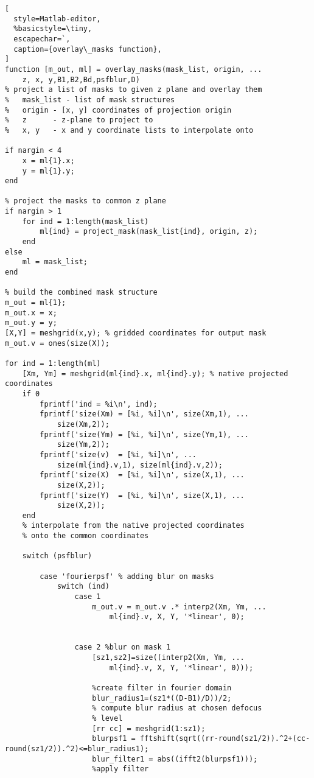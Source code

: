 \begin{lstlisting}[
  style=Matlab-editor,
  %basicstyle=\tiny,
  escapechar=`,
  caption={overlay\_masks function},
]
function [m_out, ml] = overlay_masks(mask_list, origin, ...
    z, x, y,B1,B2,Bd,psfblur,D)
% project a list of masks to given z plane and overlay them
%   mask_list - list of mask structures
%   origin - [x, y] coordinates of projection origin
%   z      - z-plane to project to
%   x, y   - x and y coordinate lists to interpolate onto

if nargin < 4
    x = ml{1}.x;
    y = ml{1}.y;
end

% project the masks to common z plane
if nargin > 1
    for ind = 1:length(mask_list)
        ml{ind} = project_mask(mask_list{ind}, origin, z);
    end
else
    ml = mask_list;
end

% build the combined mask structure
m_out = ml{1};
m_out.x = x;
m_out.y = y;
[X,Y] = meshgrid(x,y); % gridded coordinates for output mask
m_out.v = ones(size(X));

for ind = 1:length(ml)
    [Xm, Ym] = meshgrid(ml{ind}.x, ml{ind}.y); % native projected coordinates
    if 0
        fprintf('ind = %i\n', ind);
        fprintf('size(Xm) = [%i, %i]\n', size(Xm,1), ...
            size(Xm,2));
        fprintf('size(Ym) = [%i, %i]\n', size(Ym,1), ...
            size(Ym,2));
        fprintf('size(v)  = [%i, %i]\n', ...
            size(ml{ind}.v,1), size(ml{ind}.v,2));
        fprintf('size(X)  = [%i, %i]\n', size(X,1), ...
            size(X,2));
        fprintf('size(Y)  = [%i, %i]\n', size(X,1), ...
            size(X,2));
    end
    % interpolate from the native projected coordinates
    % onto the common coordinates
    
    switch (psfblur)
        
        case 'fourierpsf' % adding blur on masks
            switch (ind)
                case 1
                    m_out.v = m_out.v .* interp2(Xm, Ym, ...
                        ml{ind}.v, X, Y, '*linear', 0);
                    
                    
                case 2 %blur on mask 1
                    [sz1,sz2]=size((interp2(Xm, Ym, ...
                        ml{ind}.v, X, Y, '*linear', 0)));
                    
                    %create filter in fourier domain
                    blur_radius1=(sz1*((D-B1)/D))/2; 
                    % compute blur radius at chosen defocus 
                    % level
                    [rr cc] = meshgrid(1:sz1);
                    blurpsf1 = fftshift(sqrt((rr-round(sz1/2)).^2+(cc-round(sz1/2)).^2)<=blur_radius1);
                    blur_filter1 = abs((ifft2(blurpsf1)));
                    %apply filter
                    

\end{lstlisting}
